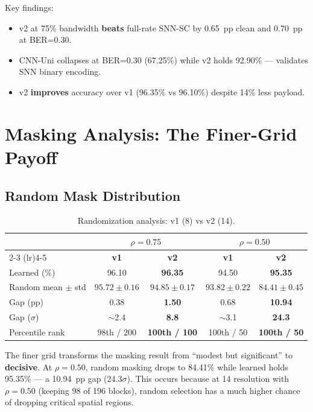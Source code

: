 \documentclass[conference]{IEEEtran}
\begin{document}
Key findings:
\begin{itemize}
    \item v2 at 75\% bandwidth \textbf{beats} full-rate SNN-SC by 0.65~pp clean and 0.70~pp at BER=0.30.
    \item CNN-Uni collapses at BER=0.30 (67.25\%) while v2 holds 92.90\% — validates SNN binary encoding.
    \item v2 \textbf{improves} accuracy over v1 (96.35\% vs 96.10\%) despite 14\% less payload.
\end{itemize}


\section{Masking Analysis: The Finer-Grid Payoff}

\subsection{Random Mask Distribution}

\begin{table}[h]
\centering
\caption{Randomization analysis: v1 (8) vs v2 (14).}
\begin{tabular}{@{}l c c c c@{}}
\toprule
& \multicolumn{2}{c}{$\rho = 0.75$} & \multicolumn{2}{c}{$\rho = 0.50$} \\
\cmidrule(lr){2-3} \cmidrule(lr){4-5}
& \textbf{v1} & \textbf{v2} & \textbf{v1} & \textbf{v2} \\
\midrule
Learned (\%) & 96.10 & \textbf{96.35} & 94.50 & \textbf{95.35} \\
Random mean $\pm$ std & $95.72 \pm 0.16$ & $94.85 \pm 0.17$ & $93.82 \pm 0.22$ & $84.41 \pm 0.45$ \\
Gap (pp) & 0.38 & \textbf{1.50} & 0.68 & \textbf{10.94} \\
Gap ($\sigma$) & $\sim$2.4 & \textbf{8.8} & $\sim$3.1 & \textbf{24.3} \\
Percentile rank & 98th / 200 & \textbf{100th / 100} & 100th / 50 & \textbf{100th / 50} \\
\bottomrule
\end{tabular}
\end{table}

The finer grid transforms the masking result from ``modest but significant'' to \textbf{decisive}. At $\rho{=}0.50$, random masking drops to 84.41\% while learned holds 95.35\% --- a 10.94~pp gap (24.3$\sigma$). This occurs because at 14 resolution with $\rho{=}0.50$ (keeping 98 of 196 blocks), random selection has a much higher chance of dropping critical spatial regions.
\end{document}
